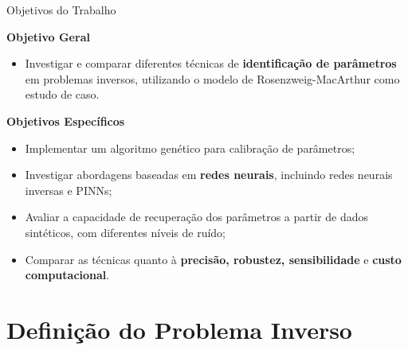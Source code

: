 \begin{frame}{Objetivos do Trabalho}

\textbf{Objetivo Geral}

\begin{itemize}
    \item Investigar e comparar diferentes técnicas de
    \textbf{identificação de parâmetros} em problemas
    inversos, utilizando o modelo de Rosenzweig-MacArthur
    como estudo de caso.
\end{itemize}

\vspace{0.35cm}

\textbf{Objetivos Específicos}

\begin{itemize}

    \item Implementar um algoritmo genético para
    calibração de parâmetros;

    \vspace{0.15cm}

    \item Investigar abordagens baseadas em
    \textbf{redes neurais}, incluindo redes neurais
    inversas e PINNs;

    \vspace{0.15cm}

    \item Avaliar a capacidade de recuperação dos
    parâmetros a partir de dados sintéticos,
    com diferentes níveis de ruído;

    \vspace{0.15cm}

    \item Comparar as técnicas quanto à
    \textbf{precisão, robustez, sensibilidade}
    e \textbf{custo computacional}.

\end{itemize}

\end{frame}

\section{Definição do Problema Inverso}

